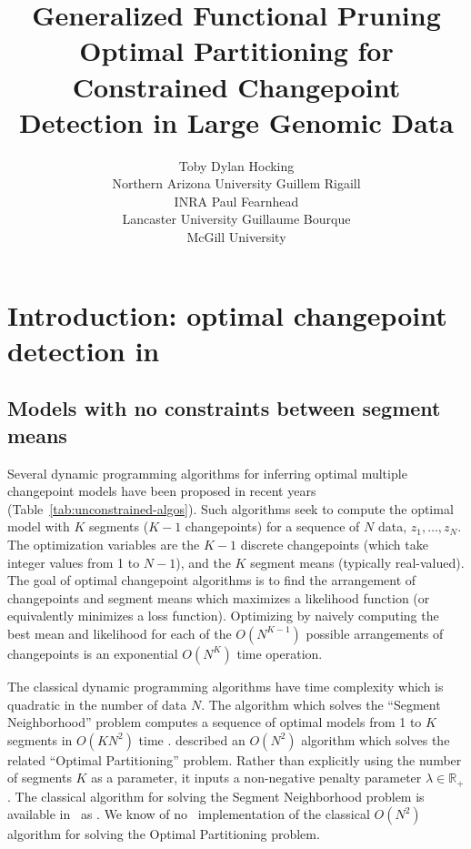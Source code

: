 \documentclass[article]{jss}
\author{Toby Dylan Hocking\\Northern Arizona University
   \And Guillem Rigaill\\INRA
   \And Paul Fearnhead\\Lancaster University
   \And Guillaume Bourque\\McGill University}
\title{Generalized Functional Pruning Optimal Partitioning
  for Constrained Changepoint Detection in Large Genomic Data}
\newcommand{\R}{\proglang{R}}
\newcommand{\RR}{\mathbb R}
\begin{document}


\section[Introduction: optimal changepoint detection in R]{Introduction: optimal changepoint detection in } \label{sec:intro}

\subsection{Models with no constraints between segment means}

Several dynamic programming algorithms for inferring optimal multiple
changepoint models have been proposed in recent years
(Table~\ref{tab:unconstrained-algos}). Such algorithms seek to compute
the optimal model with $K$ segments ($K-1$ changepoints) for a
sequence of $N$ data, $z_1,\dots,z_N$. The optimization variables are
the $K-1$ discrete changepoints (which take integer values from 1 to
$N-1$), and the $K$ segment means (typically real-valued). The goal of
optimal changepoint algorithms is to find the arrangement of
changepoints and segment means which maximizes a likelihood function
(or equivalently minimizes a loss function). Optimizing by naively
computing the best mean and likelihood for each of the $O(N^{K-1})$
possible arrangements of changepoints is an exponential $O(N^K)$ time
operation.

The classical dynamic programming algorithms have time complexity
which is quadratic in the number of data $N$. The algorithm which
solves the ``Segment Neighborhood'' problem computes a sequence of
optimal models from 1 to $K$ segments in $O(KN^2)$ time
\citep{segment-neighborhood}.  \citet{optimal-partitioning} described
an $O(N^2)$ algorithm which solves the related ``Optimal
Partitioning'' problem. Rather than explicitly using the number of
segments $K$ as a parameter, it inputs a non-negative penalty
parameter $\lambda\in \RR_+$. The classical algorithm for solving the
Segment Neighborhood problem is available in \R\ as
\citep{changepoint}. We know of no \R\ implementation of the classical
$O(N^2)$ algorithm for solving the Optimal Partitioning problem.
\end{document}

